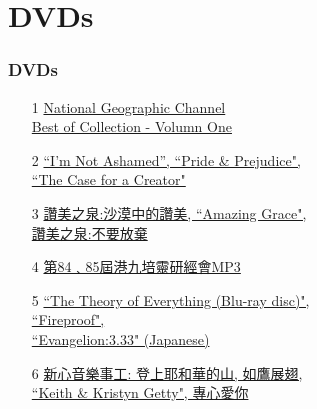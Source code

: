 \documentclass[t]{beamer}
\newcommand{\hlink}[2]{\hyperlink{#1}{#2}}
\begin{document}
\section{DVDs}

\begin{frame}[allowframebreaks]
\frametitle{DVDs}
\begin{enumerate}
\item[1] \hlink{geography}{National Geographic Channel \\Best of Collection - Volumn One}
\item[2] \hlink{case}{``I'm Not Ashamed'', ``Pride \& Prejudice",\\``The Case for a Creator"}
\item[3] \hlink{praise}{讚美之泉:沙漠中的讚美, ``Amazing Grace", \\讚美之泉:不要放棄}
\item[4] \hlink{hongkong}{第84﹑85屆港九培靈研經會MP3}
\item[5] \hlink{theory}{``The Theory of Everything (Blu-ray disc)",\\``Fireproof",\\``Evangelion:3.33" (Japanese) }
\item[6] \hlink{getty}{新心音樂事工: 登上耶和華的山, 如鷹展翅,\\``Keith \& Kristyn Getty", 專心愛你}
\end{enumerate}
\end{frame}
\end{document}
